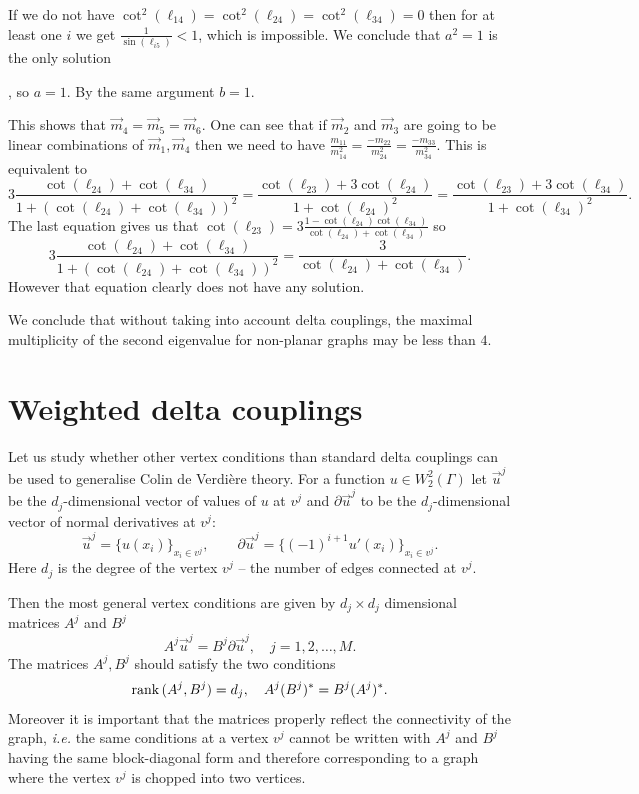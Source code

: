 \documentclass{amsart}
\theoremstyle{definition}
\theoremstyle{remark}
\numberwithin{equation}{section}
\newcommand{\vu}{\vec{u}}
\newcommand{\de}{\partial}
\begin{document}
If we do not have $\cot^2(\ell_{14})=\cot^2(\ell_{24})=\cot^2(\ell_{34})=0$ then for at least one $ i $ we get  $ \frac{1}{\sin(\ell_{i5})}  < 1$, which is impossible. We conclude that $a^2=1$ is the only solution{, so $a=1$. By the same argument $b=1$.  


This shows that $\vec{m}_4=\vec{m}_5=\vec{m}_6$. One can see that if $\vec{m}_2$ and $\vec{m}_3$ are going to be linear combinations of $\vec{m}_1,\vec{m}_4$ then we need to have 
$\frac{m_{11}}{m_{14}^2}=\frac{-m_{22}}{m_{24}^2}=\frac{-m_{33}}{m_{34}^2}.$
This is equivalent to
$$3\frac{\cot(\ell_{24})+\cot(\ell_{34})}{1+(\cot(\ell_{24})+\cot(\ell_{34}))^2}=\frac{\cot(\ell_{23})+3\cot(\ell_{24})}{1+\cot(\ell_{24})^2}=\frac{\cot(\ell_{23})+3\cot(\ell_{34})}{1+\cot(\ell_{34})^2}.$$
The last equation gives us that $\cot(\ell_{23})=3\frac{1-\cot(\ell_{24})\cot(\ell_{34})}{\cot(\ell_{24})+\cot(\ell_{34})}$ so 
$$3\frac{\cot(\ell_{24})+\cot(\ell_{34})}{1+(\cot(\ell_{24})+\cot(\ell_{34}))^2}=\frac{3}{\cot(\ell_{24})+\cot(\ell_{34})}.$$
However that equation clearly does not have any solution.

 We conclude that without taking into account delta couplings, the maximal multiplicity of the second eigenvalue for non-planar graphs may be less than $4$.

\section{Weighted delta couplings} \label{SecWDC}

Let us study whether other vertex conditions than standard delta couplings can be used to generalise
Colin de Verdi{\`e}re theory. 
 For a function $ u \in W_2^2 (\Gamma)  $ let $\vu^j$ 
 be the $d_j$-dimensional vector of values of $u$ at $v^j$ and $\de\vu^j$ to be the $d_j$-dimensional  vector of normal derivatives at $v^j$:
 \begin{equation}
 \vu^j = \{ u(x_i) \}_{x_i \in v^j}, \quad \quad \de\vu^j = \{ (-1)^{i+1} u' (x_i) \}_{x_i \in v^j}. 
 \end{equation}
Here $ d_j $ is the degree of the vertex $ v^j$ -- the number of edges connected at $ v^j$.



Then the most general vertex conditions are given by $ d_j \times d_j $ dimensional matrices $ A^j $ and $ B^j $ 
\begin{equation}
A^j \vu^j = B^j \de\vu^j, \quad j =1,2, \dots, M.
\end{equation}
The matrices $ A^j, B^j $ should satisfy the two conditions
$$  {\rm rank}\, (A^j, B^j) = d_j, \quad A^j (B^j)^* = B^j (A^j)^*. $$
Moreover it is important that the matrices properly reflect the connectivity of the graph, {\it i.e.} the same conditions 
at  a vertex $ v^j $ cannot be written with $ A^j $ and $ B^j $ having
the same block-diagonal form and therefore corresponding to a graph where the vertex $ v^j $ is chopped into two vertices.

}
\end{document}
